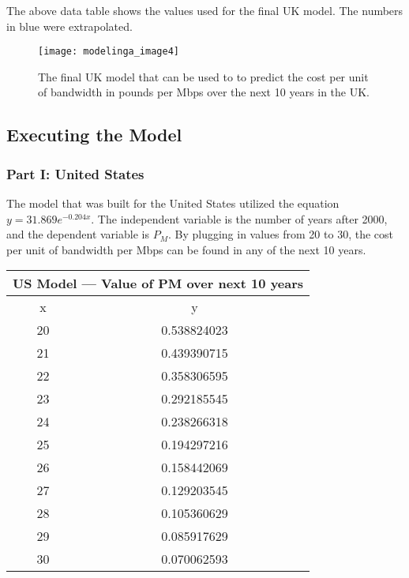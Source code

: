 \newcommand{\blue}{\color{blue}}
\newcommand{\black}{\color{black}}
The above data table shows the values used for the final UK model. The numbers in \blue blue \black were extrapolated.


    \begin{figure}[htp]
    \centering
    \begin{minipage}{9cm}
    \texttt{[image: modelinga\_image4]}
    \caption{The final UK model that can be used to to predict the cost per unit of bandwidth in pounds per Mbps over the next 10 years in the UK.}
    \label{fig:4}
    \end{minipage}
    
    \end{figure}
   
   \pagebreak
   \subsection{Executing the Model}
   \subsubsection{Part I: United States}
   The model that was built for the United States utilized the equation $y = 31.869e^{-0.204x}$. The independent variable is the number of years after 2000, and the dependent variable is $P_M$. By plugging in values from 20 to 30, the cost per unit of bandwidth per Mbps can be found in any of the next 10 years.
   
   \begin{center}
\begin{tabular}{|c|c|}
\hline
\multicolumn{2}{|c|}{US Model — Value of PM over next 10 years} \\ \hline
x                          & y                                  \\ \hline
20                         & 0.538824023                        \\ \hline
21                         & 0.439390715                        \\ \hline
22                         & 0.358306595                        \\ \hline
23                         & 0.292185545                        \\ \hline
24                         & 0.238266318                        \\ \hline
25                         & 0.194297216                        \\ \hline
26                         & 0.158442069                        \\ \hline
27                         & 0.129203545                        \\ \hline
28                         & 0.105360629                        \\ \hline
29                         & 0.085917629                        \\ \hline
30                         & 0.070062593                        \\ \hline
\end{tabular}
\end{center}
    
